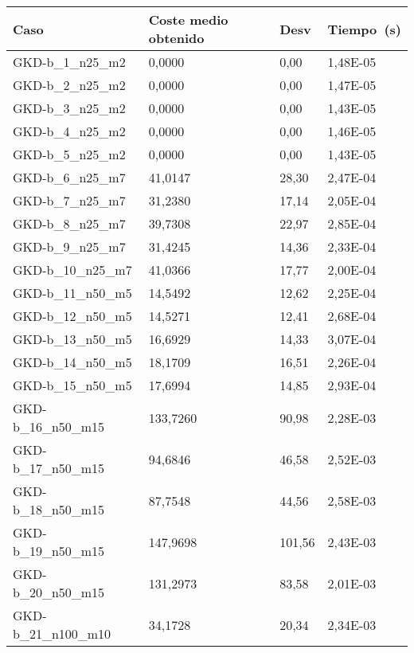 \pagebreak

\begin{table}[!ht]
    \centering
    \begin{adjustbox}{height=12cm}
    \begin{tabular}{|l|l|l|l|}
    \hline
        Caso & Coste medio obtenido & Desv & Tiempo~(s) \\ \hline
        GKD-b\_1\_n25\_m2    & 0,0000   & 0,00   & 1,48E-05 \\ \hline
        GKD-b\_2\_n25\_m2    & 0,0000   & 0,00   & 1,47E-05 \\ \hline
        GKD-b\_3\_n25\_m2    & 0,0000   & 0,00   & 1,43E-05 \\ \hline
        GKD-b\_4\_n25\_m2    & 0,0000   & 0,00   & 1,46E-05 \\ \hline
        GKD-b\_5\_n25\_m2    & 0,0000   & 0,00   & 1,43E-05 \\ \hline
        GKD-b\_6\_n25\_m7    & 41,0147  & 28,30  & 2,47E-04 \\ \hline
        GKD-b\_7\_n25\_m7    & 31,2380  & 17,14  & 2,05E-04 \\ \hline
        GKD-b\_8\_n25\_m7    & 39,7308  & 22,97  & 2,85E-04 \\ \hline
        GKD-b\_9\_n25\_m7    & 31,4245  & 14,36  & 2,33E-04 \\ \hline
        GKD-b\_10\_n25\_m7   & 41,0366  & 17,77  & 2,00E-04 \\ \hline
        GKD-b\_11\_n50\_m5   & 14,5492  & 12,62  & 2,25E-04 \\ \hline
        GKD-b\_12\_n50\_m5   & 14,5271  & 12,41  & 2,68E-04 \\ \hline
        GKD-b\_13\_n50\_m5   & 16,6929  & 14,33  & 3,07E-04 \\ \hline
        GKD-b\_14\_n50\_m5   & 18,1709  & 16,51  & 2,26E-04 \\ \hline
        GKD-b\_15\_n50\_m5   & 17,6994  & 14,85  & 2,93E-04 \\ \hline
        GKD-b\_16\_n50\_m15  & 133,7260 & 90,98  & 2,28E-03 \\ \hline
        GKD-b\_17\_n50\_m15  & 94,6846  & 46,58  & 2,52E-03 \\ \hline
        GKD-b\_18\_n50\_m15  & 87,7548  & 44,56  & 2,58E-03 \\ \hline
        GKD-b\_19\_n50\_m15  & 147,9698 & 101,56 & 2,43E-03 \\ \hline
        GKD-b\_20\_n50\_m15  & 131,2973 & 83,58  & 2,01E-03 \\ \hline
        GKD-b\_21\_n100\_m10 & 34,1728  & 20,34  & 2,34E-03 \\ \hline

\end{tabular}
\end{adjustbox}
\end{table}
